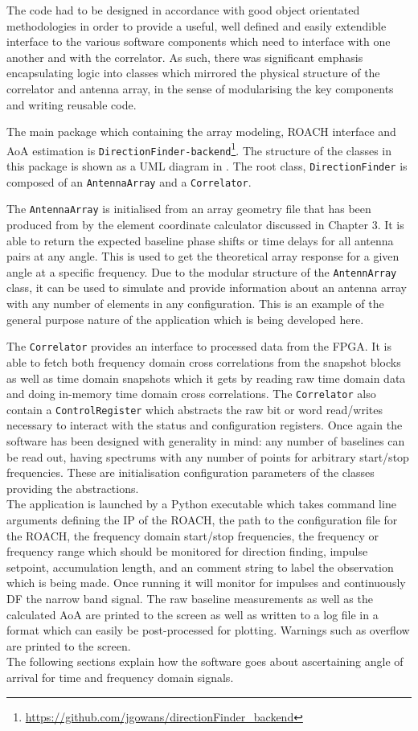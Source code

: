 The code had to be designed in accordance with good object orientated methodologies in order to provide a useful, well defined and easily extendible interface to the various software components which need to interface with one another and with the correlator. As such, there was significant emphasis encapsulating logic into classes which mirrored the physical structure of the correlator and antenna array, in the sense of modularising the key components and writing reusable code.

The main package which containing the array modeling, ROACH interface and AoA estimation is \lstinline{DirectionFinder-backend}\footnote{\url{https://github.com/jgowans/directionFinder_backend}}. The structure of the classes in this package is shown as a UML diagram in . The root class, \lstinline{DirectionFinder} is composed of an \lstinline{AntennaArray} and a \lstinline{Correlator}. 

The \lstinline{AntennaArray} is initialised from an array geometry file that has been produced from by the element coordinate calculator discussed in Chapter 3. It is able to return the expected baseline phase shifts or time delays for all antenna pairs at any angle. This is used to get the theoretical array response for a given angle at a specific frequency. Due to the modular structure of the \lstinline{AntennArray} class, it can be used to simulate and provide information about an antenna array with any number of elements in any configuration. This is an example of the general purpose nature of the application which is being developed here.

The \lstinline{Correlator} provides an interface to processed data from the FPGA. It is able to fetch both frequency domain cross correlations from the snapshot blocks as well as time domain snapshots which it gets by reading raw time domain data and doing in-memory time domain cross correlations. The \lstinline{Correlator} also contain a \lstinline{ControlRegister} which abstracts the raw bit or word read/writes necessary to interact with the status and configuration registers. Once again the software has been designed with generality in mind: any number of baselines can be read out, having spectrums with any number of points for arbitrary start/stop frequencies. These are initialisation configuration parameters of the classes providing the abstractions.\\

The application is launched by a Python executable which takes command line arguments defining the IP of the ROACH, the path to the configuration file for the ROACH, the frequency domain start/stop frequencies, the frequency or frequency range which should be monitored for direction finding, impulse setpoint, accumulation length, and an comment string to label the observation which is being made. Once running it will monitor for impulses and continuously DF the narrow band signal. The raw baseline measurements as well as the calculated AoA are printed to the screen as well as written to a log file in a format which can easily be post-processed for plotting. Warnings such as overflow are printed to the screen.\\

The following sections explain how the software goes about ascertaining angle of arrival for time and frequency domain signals.




